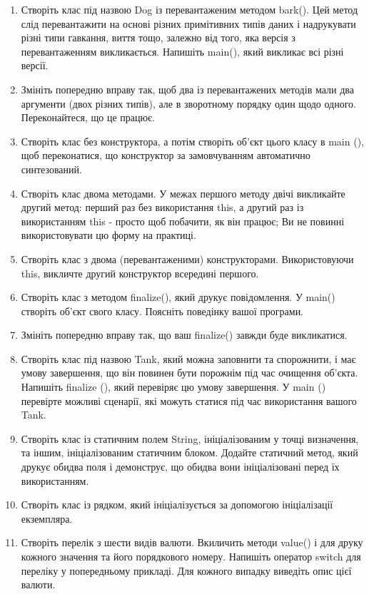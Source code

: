 \documentclass[]{article}
\begin{document}
\begin{enumerate}
\item
 Створіть клас під назвою Dog із перевантаженим методом bark(). Цей метод слід перевантажити на основі різних примітивних типів даних і надрукувати різні типи гавкання, виття тощо, залежно від того, яка версія з перевантаженням викликається. 
Напишіть main(), який викликає всі різні версії.
\item
 Змініть попередню вправу так, щоб два із перевантажених методів мали два аргументи (двох різних типів), але в зворотному порядку один щодо одного. Переконайтеся, що це працює.
\item
 Створіть клас без конструктора, а потім створіть об'єкт цього класу в main (), щоб переконатися, що конструктор за замовчуванням автоматично синтезований.
\item
 Створіть клас двома методами. У межах першого методу двічі викликайте другий метод: перший раз без використання this, а другий раз із використанням this - просто щоб побачити, як він працює; Ви не повинні використовувати цю форму на практиці.
\item
 Створіть клас з двома (перевантаженими) конструкторами. Використовуючи this, викличте другий конструктор всередині першого.
\item
 Створіть клас з методом finalize(), який друкує повідомлення. У main() створіть об'єкт свого класу. Поясніть поведінку вашої програми.
\item
 Змініть попередню вправу так, що ваш finalize() завжди буде викликатися.
\item
 Створіть клас під назвою Tank, який можна заповнити та спорожнити, і має умову завершення, що він повинен бути порожнім під час очищення об’єкта. Напишіть finalize (), який перевіряє цю умову завершення. У main () перевірте можливі сценарії, які можуть статися під час використання вашого Tank.
\item
 Створіть клас із статичним полем String, ініціалізованим у точці визначення, та іншим, ініціалізованим статичним блоком. Додайте статичний метод, який друкує обидва поля і демонструє, що обидва вони ініціалізовані перед їх використанням.
\item
 Створіть клас із рядком, який ініціалізується за допомогою ініціалізації екземпляра.

\item
 Створіть перелік  з шести видів валюти. Вкиличить методи value() і для друку кожного значення та його порядкового номеру.
 Напишіть оператор switch для переліку у попередньому прикладі. Для кожного випадку виведіть опис цієї валюти.


\end{enumerate}
\end{document}
